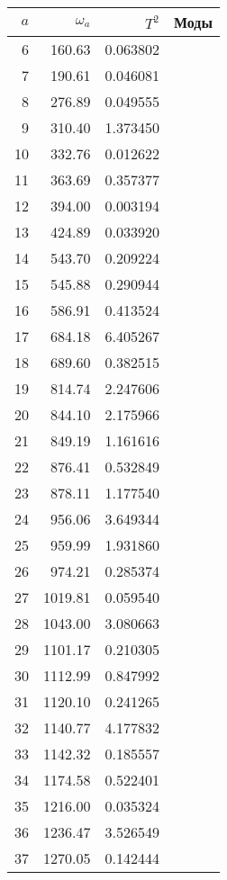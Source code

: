 \tiny
\begin{tabular}{r|rr|l}
  \toprule
  $a$ &  $\omega_a$ & $T^2$ & Моды \\ 
  \midrule
 6 &      160.63  &  0.063802  & \\
 7 &      190.61  &  0.046081  & \\
 8 &      276.89  &  0.049555  & \\
 9 &      310.40  &  1.373450  & \\
10 &      332.76  &  0.012622  & \\
11 &      363.69  &  0.357377  & \\
12 &      394.00  &  0.003194  & \\
13 &      424.89  &  0.033920  & \\
14 &      543.70  &  0.209224  & \\
15 &      545.88  &  0.290944  & \\
16 &      586.91  &  0.413524  & \\
17 &      684.18  &  6.405267  & \\
18 &      689.60  &  0.382515  & \\
19 &      814.74  &  2.247606  & \\
20 &      844.10  &  2.175966  & \\
21 &      849.19  &  1.161616  & \\
22 &      876.41  &  0.532849  & \\
23 &      878.11  &  1.177540  & \\
24 &      956.06  &  3.649344  & \\
25 &      959.99  &  1.931860  & \\
26 &      974.21  &  0.285374  & \\
27 &     1019.81  &  0.059540  & \\
28 &     1043.00  &  3.080663  & \\
29 &     1101.17  &  0.210305  & \\
30 &     1112.99  &  0.847992  & \\
31 &     1120.10  &  0.241265  & \\
32 &     1140.77  &  4.177832  & \\
33 &     1142.32  &  0.185557  & \\
34 &     1174.58  &  0.522401  & \\
35 &     1216.00  &  0.035324  & \\
36 &     1236.47  &  3.526549  & \\
37 &     1270.05  &  0.142444  & \\

\end{tabular}
